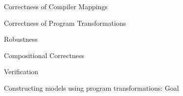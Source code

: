 \documentclass[notes, xcolor = dvipsnames]{beamer}
\begin{document}
    \begin{frame}{Correctness of Compiler Mappings}
        
    \end{frame}

    \begin{frame}{Correctness of Program Transformations}
        
    \end{frame}

    \begin{frame}{Robustness}
        
    \end{frame}

    \begin{frame}{Compositional Correctness}
    
    \end{frame}

    \begin{frame}{Verification}
        
    \end{frame}


    \begin{frame}{Constructing models using program transformations: Goal}


    \end{frame}
\end{document}
